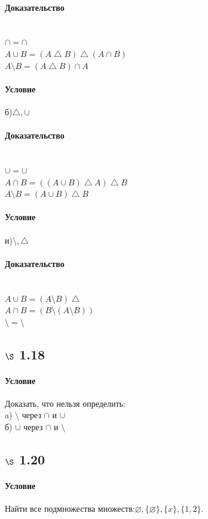 \documentclass[a4paper,12pt]{article}
\begin{document}
\paragraph*{Доказательство} \mbox{}\\
$\cap = \cap $\\
$ A \cup B = (A \bigtriangleup B) \bigtriangleup ( A \cap B)$\\
$ A \setminus B =  (A \bigtriangleup B) \cap A$
\paragraph*{Условие}
б)$\bigtriangleup, \cup$
\paragraph*{Доказательство} \mbox{}\\
$\cup = \cup $\\
$ A \cap B = ((A \cup B) \bigtriangleup A) \bigtriangleup B $\\
$ A \setminus B =  (A \cup B) \bigtriangleup B$
\paragraph*{Условие}
и)$\setminus, \bigtriangleup$
\paragraph*{Доказательство} \mbox{}\\
$ A \cup B = (A \setminus B) \bigtriangleup $\\
$ A \cap B = (B \setminus (A \setminus B)) $\\
$ \setminus =  \setminus$

\subsection*{$\S$ 1.18}
\paragraph*{Условие}
Доказать, что нельзя определить:\\
a) $\setminus$ через $\cap$ и $\cup $\\
б) $\cup$ через $\cap$ и $\setminus $

\subsection*{$\S$ 1.20}
\paragraph*{Условие}
Найти все подмножества множеств:$\varnothing, \{ \varnothing \}, \{ x \}, \{1, 2\}. $
\end{document}
